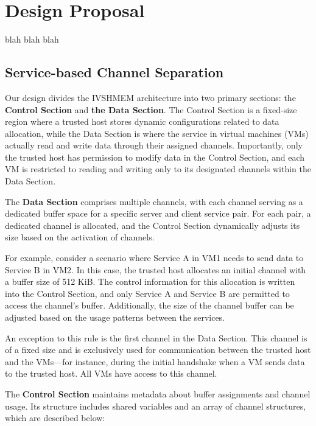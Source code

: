 \documentclass[conference]{IEEEtran}
\begin{document}
\section{Design Proposal}

blah blah blah

\subsection{Service-based Channel Separation}

Our design divides the IVSHMEM architecture into two primary sections: the
\textbf{Control Section} and \textbf{the Data Section}. The Control Section is
a fixed-size region where a trusted host stores dynamic configurations related
to data allocation, while the Data Section is where the service in virtual
machines (VMs) actually read and write data through their assigned channels.
Importantly, only the trusted host has permission to modify data in the Control
Section, and each VM is restricted to reading and writing only to its
designated channels within the Data Section.

The \textbf{Data Section} comprises multiple channels, with each channel
serving as a dedicated buffer space for a specific server and client service
pair. For each pair, a dedicated channel is allocated, and the Control Section
dynamically adjusts its size based on the activation of channels.

For example, consider a scenario where Service A in VM1 needs to send data to
Service B in VM2. In this case, the trusted host allocates an initial channel
with a buffer size of 512 KiB. The control information for this allocation is
written into the Control Section, and only Service A and Service B are
permitted to access the channel’s buffer. Additionally, the size of the channel
buffer can be adjusted based on the usage patterns between the services.

An exception to this rule is the first channel in the Data Section. This
channel is of a fixed size and is exclusively used for communication between
the trusted host and the VMs—for instance, during the initial handshake when a
VM sends data to the trusted host. All VMs have access to this channel.

The \textbf{Control Section} maintains metadata about buffer assignments and
channel usage. Its structure includes shared variables and an array of channel
structures, which are described below:
\end{document}
